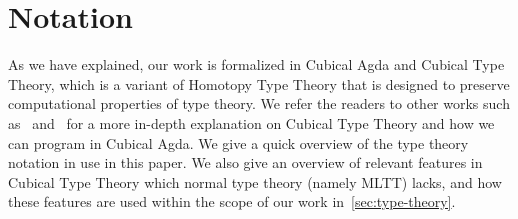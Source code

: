 \section{Notation}\label{sec:notation}
As we have explained, our work is formalized in Cubical Agda and Cubical Type Theory,
which is a variant of Homotopy Type Theory that is designed to preserve
computational properties of type theory.
We refer the readers to other works such as~\cite{vezzosiCubicalAgdaDependently2019}
and~\cite{cohenCubicalTypeTheory2018} for a more in-depth explanation on Cubical Type Theory
and how we can program in Cubical Agda.
We give a quick overview of the type theory notation in use in this paper.
We also give an overview of relevant features
in Cubical Type Theory which normal type theory (namely MLTT) lacks, and how these features
are used within the scope of our work in~\cref{sec:type-theory}.

